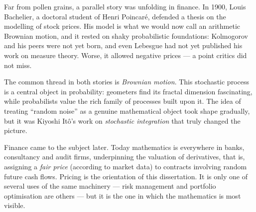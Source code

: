 Far from pollen grains, a parallel story was unfolding in finance. In 1900, Louis Bachelier, a doctoral student of Henri Poincaré, defended a thesis on the modelling of stock prices. His model is what we would now call an arithmetic Brownian motion, and it rested on shaky probabilistic foundations: Kolmogorov and his peers were not yet born, and even Lebesgue had not yet published his work on measure theory. Worse, it allowed negative prices --- a point critics did not miss.

The common thread in both stories is \emph{Brownian motion}. This stochastic process is a central object in probability: geometers find its fractal dimension fascinating, while probabilists value the rich family of processes built upon it. The idea of treating “random noise” as a genuine mathematical object took shape gradually, but it was Kiyoshi Itô’s work on \emph{stochastic integration} that truly changed the picture.

Finance came to the subject later. Today mathematics is everywhere in banks, consultancy and audit firms, underpinning the valuation of derivatives, that is, assigning a \emph{fair price} (according to market data) to contracts involving random future cash flows. Pricing is the orientation of this dissertation. It is only one of several uses of the same machinery --- risk management and portfolio optimisation are others --- but it is the one in which the mathematics is most visible.

\renewcommand{\thesection}{\thechapter.\arabic{section}}
